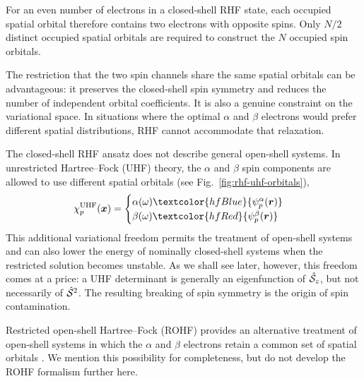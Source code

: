 \documentclass[11pt,a4paper,titlepage]{article}
\numberwithin{equation}{section}
\newcommand{\br}{\boldsymbol{r}}
\newcommand{\bx}{\boldsymbol{x}}
\newcommand{\chS}{\Hat{\mathcal{S}}}
\newcommand{\red}[1]{\textcolor{hfRed}{#1}}
\newcommand{\blue}[1]{\textcolor{hfBlue}{#1}}
\begin{document}
For an even number of electrons in a closed-shell RHF state, each occupied
spatial orbital therefore contains two electrons with opposite spins. Only
$N/2$ distinct occupied spatial orbitals are required to construct the
$N$ occupied spin orbitals.

The restriction that the two spin channels share the same spatial orbitals
can be advantageous: it preserves the closed-shell spin symmetry and reduces
the number of independent orbital coefficients. It is also a genuine
constraint on the variational space. In situations where the optimal
$\alpha$ and $\beta$ electrons would prefer different spatial
distributions, RHF cannot accommodate that relaxation.

The closed-shell RHF ansatz does not describe general open-shell systems. In
unrestricted Hartree--Fock (UHF) theory, the $\alpha$ and $\beta$
spin components are allowed to use different spatial orbitals (see Fig.~\ref{fig:rhf-uhf-orbitals}),
\begin{equation}
  \chi_p^\text{UHF}(\bx)
  =
  \begin{cases}
    \alpha(\omega)\blue{\psi_p^\alpha(\br)}\\
    \beta(\omega)\red{\psi_p^\beta(\br)}
  \end{cases}
\end{equation}
This additional variational freedom permits the treatment of open-shell
systems and can also lower the energy of nominally closed-shell systems when
the restricted solution becomes unstable. As we shall see later, however,
this freedom comes at a price: a UHF determinant is generally an eigenfunction
of $\chS_z$, but not necessarily of $\chS^2$. The resulting breaking of
spin symmetry is the origin of spin contamination.

Restricted open-shell Hartree--Fock (ROHF) provides an alternative treatment
of open-shell systems in which the $\alpha$ and $\beta$ electrons retain a
common set of spatial orbitals \citep{Roothaan1960}. We mention this possibility for completeness,
but do not develop the ROHF formalism further here.
\end{document}

